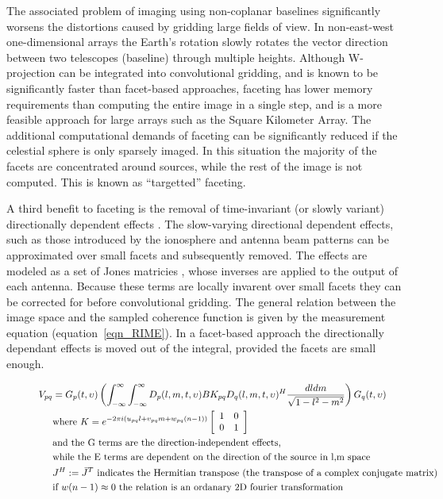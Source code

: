 \documentclass[a4paper, two column]{article}
\begin{document}
The associated problem of imaging using non-coplanar baselines significantly worsens the distortions caused by gridding large fields of view. In non-east-west one-dimensional arrays the 
Earth's rotation slowly rotates the vector direction between two telescopes (baseline) through multiple heights. Although W-projection can be integrated into convolutional gridding, and is known to be significantly faster than facet-based approaches, faceting has lower memory requirements 
than computing the entire image in a single step, and is a more feasible approach for large arrays such as the Square Kilometer Array. The additional computational demands of faceting can be significantly reduced if the celestial sphere is only sparsely imaged. In this situation the majority
of the facets are concentrated around sources, while the rest of the image is not computed. This is known as ``targetted'' faceting.

A third benefit to faceting is the removal of time-invariant (or slowly variant) directionally dependent effects \cite{2011A&A...527A.107S}. The slow-varying directional dependent effects, such as those introduced by the 
ionosphere and antenna beam patterns can be approximated over small facets and subsequently removed. The effects are modeled as a set of Jones matricies \cite{2011A&A...527A.106S}, whose inverses are applied to the output of each antenna. Because these terms are locally invarent over small 
facets they can be corrected for before convolutional gridding. The general relation between the image space and the sampled coherence function is given by the measurement equation (equation~\ref{eqn_RIME}). In a facet-based approach
the directionally dependant effects is moved out of the integral, provided the facets are small enough.

\begin{figure}
\begin{mdframed}
\begin{equation}
\label{eqn_RIME}
\begin{split}
    V_{pq} &= G_p(t,\upsilon)\left(\int_{-\infty}^{\infty}\int_{-\infty}^{\infty}D_p(l,m,t,\upsilon)BK_{pq}D_q(l,m,t,\upsilon)^H\frac{dldm}{\sqrt{1-l^2-m^2}}\right)G_q(t,\upsilon)\\
	  &\text{where }K = e^{-2\pi i(u_{pq}l+v_{pq}m+w_{pq}(n-1))}
    \left[\begin{array}{c c}
     1 & 0 \\
     0 & 1 \\
    \end{array}\right]\\
	 &\text{and the G terms are the direction-independent effects,}\\
	 &\text{while the E terms are dependent on the direction of the source in l,m space}\\
 	 &J^H:=\bar J^T \text{ indicates the Hermitian transpose (the transpose of a complex conjugate matrix)}\\ 
 	 &\text{if }w(n-1)\approx 0\text{ the relation is an ordanary 2D fourier transformation}
\end{split}
\end{equation}
\end{mdframed}
\end{figure}
\end{document}

